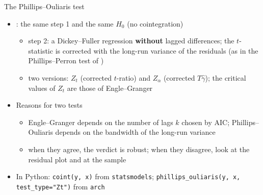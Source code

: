 \begin{frame}{The Phillips--Ouliaris test}
\itemsize{\small}
\begin{itemize}
    \item {}: the same step 1 and the same $H_0$ (no cointegration)
    \begin{itemize}
        \item step 2: a Dickey--Fuller regression \textbf{without} lagged differences; the $t$-statistic is corrected with the long-run variance of the residuals (as in the Phillips--Perron test of )
        \item two versions: $Z_t$ (corrected $t$-ratio) and $Z_\alpha$ (corrected $T\hat\gamma$); the critical values of $Z_t$ are those of Engle--Granger
    \end{itemize}
    \item Reasons for two tests
    \begin{itemize}
        \item Engle--Granger depends on the number of lags $k$ chosen by AIC; Phillips--Ouliaris depends on the bandwidth of the long-run variance
        \item when they agree, the verdict is robust; when they disagree, look at the residual plot and at the sample
    \end{itemize}
    \item In Python: \texttt{coint(y, x)} from \texttt{statsmodels}; \texttt{phillips\_ouliaris(y, x, test\_type="Zt")} from \texttt{arch}
\end{itemize}
\end{frame}

